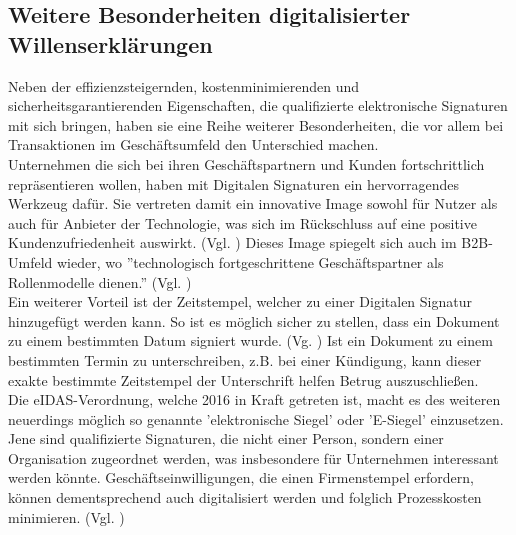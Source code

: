 \documentclass[deutsch]{lib/llncs/llncs}
\begin{document}
\subsection{Weitere Besonderheiten digitalisierter Willenserklärungen}
Neben der effizienzsteigernden, kostenminimierenden und sicherheitsgarantierenden Eigenschaften, die qualifizierte elektronische Signaturen mit sich bringen, haben sie eine Reihe weiterer Besonderheiten, die vor allem bei Transaktionen im Geschäftsumfeld den Unterschied machen. \\
Unternehmen die sich bei ihren Geschäftspartnern und Kunden fortschrittlich repräsentieren wollen, haben mit Digitalen Signaturen ein hervorragendes Werkzeug dafür. Sie vertreten damit ein innovative Image sowohl für Nutzer als auch für Anbieter der Technologie, was sich im Rückschluss auf eine positive Kundenzufriedenheit auswirkt. (Vgl. \cite[S. 7]{Zitat05}) Dieses Image spiegelt sich auch im B2B-Umfeld wieder, wo ''technologisch fortgeschrittene Geschäftspartner als Rollenmodelle dienen.'' (Vgl. \cite[S. 12]{Zitat05}) \\
Ein weiterer Vorteil ist der Zeitstempel, welcher zu einer Digitalen Signatur hinzugefügt werden kann. So ist es möglich sicher zu stellen, dass ein Dokument zu einem bestimmten Datum signiert wurde. (Vg. \cite[S. 7]{Zitat05}) Ist ein Dokument zu einem bestimmten Termin zu unterschreiben, z.B. bei einer Kündigung, kann dieser exakte bestimmte Zeitstempel der Unterschrift helfen Betrug auszuschließen. \\
Die eIDAS-Verordnung, welche 2016 in Kraft getreten ist, macht es des weiteren neuerdings möglich so genannte 'elektronische Siegel' oder 'E-Siegel' einzusetzen. Jene sind qualifizierte Signaturen, die nicht einer Person, sondern einer Organisation zugeordnet werden, was insbesondere für Unternehmen interessant werden könnte.  Geschäftseinwilligungen, die einen Firmenstempel erfordern, können dementsprechend auch digitalisiert werden und folglich Prozesskosten minimieren. (Vgl. \cite[S. 30-31]{Zitat05})
\end{document}

